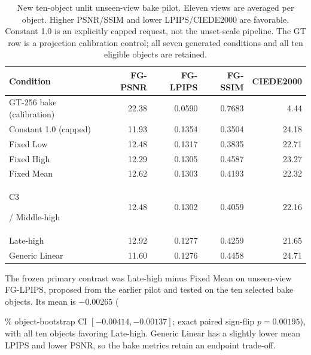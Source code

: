 \documentclass[times,twocolumn,final]{elsarticle}
\providecommand{\DIFadd}[1]{{\protect\color{blue} \sf #1}} %
\providecommand{\DIFaddbegin}{} %
\providecommand{\DIFaddend}{} %
\providecommand{\DIFaddFL}[1]{\DIFadd{#1}} %
\providecommand{\DIFaddbeginFL}{\DIFaddbegin} %
\providecommand{\DIFaddendFL}{\DIFaddend} %
\renewcommand{\DIFaddbeginFL}{}
\renewcommand{\DIFaddendFL}{}
\renewcommand{\DIFaddFL}[1]{#1}
\begin{document}
  \DIFaddbegin \begin{table}[ht]
\centering\scriptsize
\caption{New ten-object unlit unseen-view bake pilot. Eleven views are averaged per object. Higher PSNR/SSIM and lower LPIPS/CIEDE2000 are favorable. Constant 1.0 is an explicitly capped request, not the unset-scale pipeline. The GT row is a projection calibration control; all seven generated conditions and all ten eligible objects are retained.}
\label{tab:new-bake}
\begin{tabular}{lrrrr}
\toprule \DIFaddFL{Condition }& \DIFaddendFL FG-PSNR  

 \DIFaddbeginFL & \DIFaddFL{FG-LPIPS }& \DIFaddFL{FG-SSIM }& \DIFaddFL{CIEDE2000 }\\
\midrule
\DIFaddFL{GT-256 bake (calibration) }& \DIFaddFL{22.38 }& \DIFaddFL{0.0590 }& \DIFaddFL{0.7683 }& \DIFaddFL{4.44 }\\
\DIFaddFL{Constant 1.0 (capped) }& \DIFaddFL{11.93 }& \DIFaddFL{0.1354 }& \DIFaddFL{0.3504 }& \DIFaddFL{24.18 }\\
\DIFaddFL{Fixed Low }& \DIFaddFL{12.48 }& \DIFaddFL{0.1317 }& \DIFaddFL{0.3835 }& \DIFaddFL{22.71 }\\
\DIFaddFL{Fixed High }& \DIFaddFL{12.29 }& \DIFaddFL{0.1305 }& \DIFaddFL{0.4587 }& \DIFaddFL{23.27 }\\
\DIFaddFL{Fixed Mean }& \DIFaddFL{12.62 }& \DIFaddFL{0.1303 }& \DIFaddFL{0.4193 }& \DIFaddFL{22.32 }\\
\DIFaddendFL C3  

 \DIFaddbeginFL \DIFaddFL{/ Middle-high }& \DIFaddFL{12.48 }& \DIFaddFL{0.1302 }& \DIFaddFL{0.4059 }& \DIFaddFL{22.16 }\\
\DIFaddFL{Late-high }& \DIFaddFL{12.92 }& \DIFaddFL{0.1277 }& \DIFaddFL{0.4259 }& \DIFaddFL{21.65 }\\
\DIFaddFL{Generic Linear }& \DIFaddFL{11.60 }& \DIFaddFL{0.1276 }& \DIFaddFL{0.4458 }& \DIFaddFL{24.71 }\\
\bottomrule\end{tabular}
\end{table}
\DIFaddend 

The  
 \DIFaddbegin \DIFadd{frozen primary contrast was Late-high minus Fixed Mean on unseen-view FG-LPIPS, proposed from the earlier pilot and tested on the ten selected bake objects. Its mean is $-0.00265$ }\DIFaddend ( 

 \DIFaddbegin \DIFadd{95\% object-bootstrap CI $[-0.00414,-0.00137]$; exact paired sign-flip $p=0.00195$), with all ten objects favoring Late-high. Generic Linear has a slightly lower mean LPIPS and lower PSNR, so the bake metrics retain an endpoint trade-off}\DIFaddend .
\end{document}
